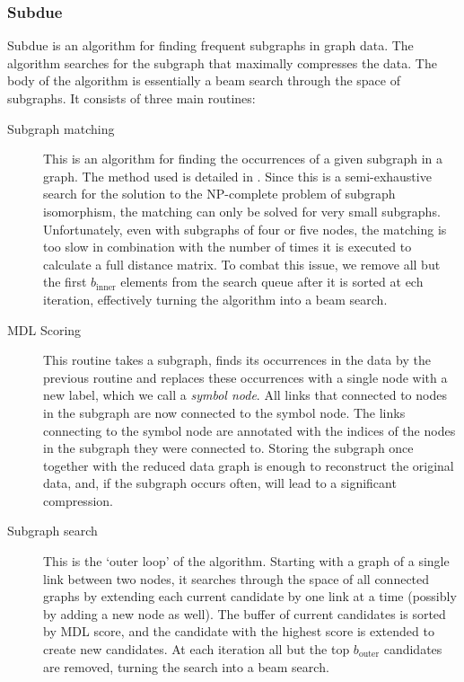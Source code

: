 \documentclass{article}
\begin{document}
\subsubsection*{Subdue}

Subdue \cite{ketkar2005subdue} is an algorithm for finding frequent subgraphs in graph data. The algorithm searches for the subgraph that maximally compresses the data. The body of the algorithm is essentially a beam search through the space of subgraphs. It consists of three main routines:

\begin{description}
\item[Subgraph matching] This is an algorithm for finding the occurrences of a given subgraph in a graph. The method used is detailed in \cite{bunke1983inexact}. Since this is  a semi-exhaustive search for the solution to the NP-complete problem of subgraph isomorphism, the matching can only be solved for very small subgraphs. Unfortunately, even with subgraphs of four or five nodes, the matching is too slow in combination with the number of times it is executed to calculate a full distance matrix. To combat this issue, we remove all but the first $b_{\mbox{inner}}$ elements from the search queue after it is sorted at ech iteration, effectively turning the algorithm into a beam search.
\item[MDL Scoring]
This routine takes a subgraph, finds its occurrences in the data by the previous routine and replaces these occurrences with a single node with a new label, which we call a \emph{symbol node}. All links that connected to nodes in the subgraph are now connected to the symbol node. The links connecting to the symbol node are annotated with the indices of the nodes in the subgraph they were connected to. Storing the subgraph once together with the reduced data graph is enough to reconstruct the original data, and, if the subgraph occurs often, will lead to a significant compression.
\item[Subgraph search]
This is the `outer loop' of the algorithm. Starting with a graph of a single link between two nodes, it searches through the space of all connected graphs by extending each current candidate by one link at a time (possibly by adding a new node as well). The buffer of current candidates is sorted by MDL score, and the candidate with the highest score is extended to create new candidates. At each iteration all but the top $b_{\mbox{outer}}$ candidates are removed, turning the search into a beam search.
\end{description}
\end{document}
